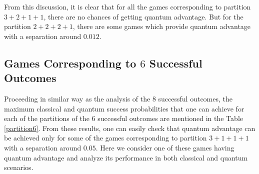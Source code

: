 \documentclass[]{svjour3}
\begin{document}

From this discussion, it is clear that for all the games corresponding to partition $3+2+1+1$, there are no chances of getting quantum advantage. But for the partition $2+2+2+1$, there are some games which provide quantum advantage with a separation around $0.012$. 


\subsection{Games Corresponding to $6$ Successful Outcomes}

Proceeding in similar way as the analysis of the $8$ successful outcomes, the maximum classical and quantum success probabilities that one can achieve for each of the partitions of the $6$ successful outcomes are mentioned in the Table \ref{partition6}. From these results, one can easily check that quantum advantage can be achieved only for some of the games corresponding to partition $3+1+1+1$ with a separation around $0.05$. Here we consider one of these games having quantum advantage and analyze its performance in both classical and quantum scenarios.




\begin{table}[htb]
	\begin{center}
		\setlength{\tabcolsep}{0.35em}
	\end{center}
	\caption{Analysis of partitions for $6$ successful outcomes} 
	\label{partition6}
\end{table}
\end{document}
